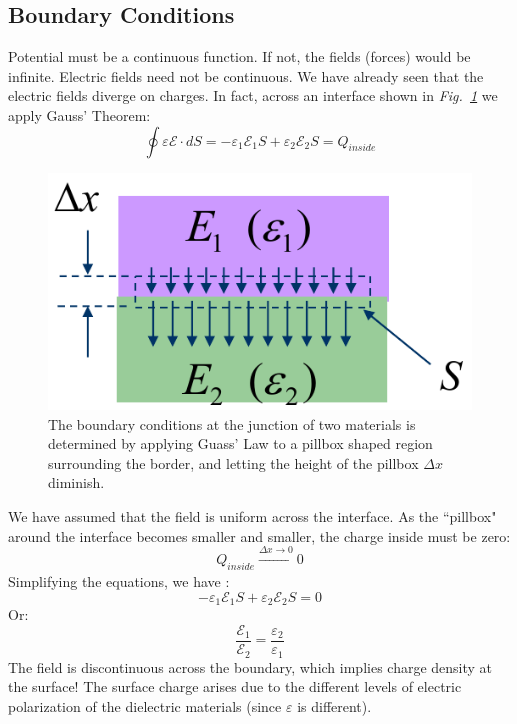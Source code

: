 \subsection{Boundary Conditions}
Potential must be a continuous function. If not, the fields (forces) would be infinite.  Electric fields need not be continuous. We have already seen that the electric fields diverge on charges. In fact, across an interface shown in \emph{Fig.~\ref{fig:mod2-2_ICtech_sld_16}} we apply Gauss' Theorem: 
    \begin{equation} 
        \oint {\varepsilon \mathcal{E} \cdot dS = - {\varepsilon _1}{\mathcal{E}_1}S + {\varepsilon _2}{\mathcal{E}_2}S = {Q_{inside}}}
    \end{equation}
\begin{figure}[H]
\centering
\includegraphics[width=.35\columnwidth]{mod2-2_ICtech_sld_16}
\caption{The boundary conditions at the junction of two materials is determined by applying Guass' Law to a pillbox shaped region surrounding the border, and letting the height of the pillbox $\Delta x$ diminish.}
\label{fig:mod2-2_ICtech_sld_16}
\end{figure}
\noindent
We have assumed that the field is uniform across the interface.  As the ``pillbox" around the interface becomes smaller and smaller, the charge inside must be zero:
    \begin{equation} 
        Q_{inside} \xrightarrow[]{\Delta x \rightarrow 0} 0 
    \end{equation}
Simplifying the equations, we have :
    \begin{equation}  
        - {\varepsilon _1}{\mathcal{E}_1}S + {\varepsilon _2}{\mathcal{E}_2}S = 0
    \end{equation}
Or:
    \begin{equation} 
        \frac{{{\mathcal{E}_1}}}{{{\mathcal{E}_2}}} = \frac{{{\varepsilon _2}}}{{{\varepsilon _1}}} 
    \end{equation}
The field is discontinuous across the boundary, which implies charge density at the surface!  The surface charge arises due to the different levels of electric polarization of the dielectric materials (since $\varepsilon$ is different).
\newpage
